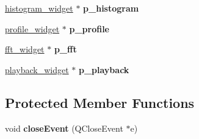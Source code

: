 \begin{DoxyCompactItemize}
\item 
\hypertarget{classControlsBox_ab65eb7bd4acebbe18d7c07601e8d1947}{\hyperlink{classhistogram__widget}{histogram\+\_\+widget} $\ast$ {\bfseries p\+\_\+histogram}}\label{classControlsBox_ab65eb7bd4acebbe18d7c07601e8d1947}

\item 
\hypertarget{classControlsBox_a16d1414f4ee4de1815c3baded19ee2a9}{\hyperlink{classprofile__widget}{profile\+\_\+widget} $\ast$ {\bfseries p\+\_\+profile}}\label{classControlsBox_a16d1414f4ee4de1815c3baded19ee2a9}

\item 
\hypertarget{classControlsBox_a9b2b3feae093b0be57fb9cdd472ca080}{\hyperlink{classfft__widget}{fft\+\_\+widget} $\ast$ {\bfseries p\+\_\+fft}}\label{classControlsBox_a9b2b3feae093b0be57fb9cdd472ca080}

\item 
\hypertarget{classControlsBox_a89b1ed7ff8f77db0c572f3eae6aa539b}{\hyperlink{classplayback__widget}{playback\+\_\+widget} $\ast$ {\bfseries p\+\_\+playback}}\label{classControlsBox_a89b1ed7ff8f77db0c572f3eae6aa539b}

\end{DoxyCompactItemize}
\subsection*{Protected Member Functions}
\begin{DoxyCompactItemize}
\item 
\hypertarget{classControlsBox_a8c8dc69d47160fbe9e12e3a9ad6f0c17}{void {\bfseries close\+Event} (Q\+Close\+Event $\ast$e)}\label{classControlsBox_a8c8dc69d47160fbe9e12e3a9ad6f0c17}

\end{DoxyCompactItemize}


